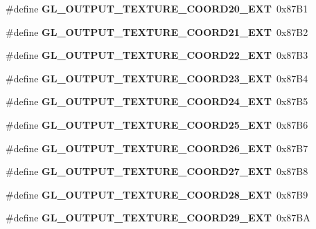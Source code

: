 \begin{DoxyCompactItemize}
\item 
\#define {\bfseries G\+L\+\_\+\+O\+U\+T\+P\+U\+T\+\_\+\+T\+E\+X\+T\+U\+R\+E\+\_\+\+C\+O\+O\+R\+D20\+\_\+\+E\+X\+T}~0x87\+B1\label{_s_d_l__opengl_8h_a3699d7d0b9e2bba6b818825b28647cda}

\item 
\#define {\bfseries G\+L\+\_\+\+O\+U\+T\+P\+U\+T\+\_\+\+T\+E\+X\+T\+U\+R\+E\+\_\+\+C\+O\+O\+R\+D21\+\_\+\+E\+X\+T}~0x87\+B2\label{_s_d_l__opengl_8h_a564ae11b7d068f21559b9103828b5d60}

\item 
\#define {\bfseries G\+L\+\_\+\+O\+U\+T\+P\+U\+T\+\_\+\+T\+E\+X\+T\+U\+R\+E\+\_\+\+C\+O\+O\+R\+D22\+\_\+\+E\+X\+T}~0x87\+B3\label{_s_d_l__opengl_8h_a3ac53e5144dadbe02f8ab6454df5983e}

\item 
\#define {\bfseries G\+L\+\_\+\+O\+U\+T\+P\+U\+T\+\_\+\+T\+E\+X\+T\+U\+R\+E\+\_\+\+C\+O\+O\+R\+D23\+\_\+\+E\+X\+T}~0x87\+B4\label{_s_d_l__opengl_8h_a59fca5324a8f1f86dfa5171d965ab938}

\item 
\#define {\bfseries G\+L\+\_\+\+O\+U\+T\+P\+U\+T\+\_\+\+T\+E\+X\+T\+U\+R\+E\+\_\+\+C\+O\+O\+R\+D24\+\_\+\+E\+X\+T}~0x87\+B5\label{_s_d_l__opengl_8h_a4f813a249859f8b36ccc554656dd077b}

\item 
\#define {\bfseries G\+L\+\_\+\+O\+U\+T\+P\+U\+T\+\_\+\+T\+E\+X\+T\+U\+R\+E\+\_\+\+C\+O\+O\+R\+D25\+\_\+\+E\+X\+T}~0x87\+B6\label{_s_d_l__opengl_8h_ae83e7087ff91126bed4311a669487eca}

\item 
\#define {\bfseries G\+L\+\_\+\+O\+U\+T\+P\+U\+T\+\_\+\+T\+E\+X\+T\+U\+R\+E\+\_\+\+C\+O\+O\+R\+D26\+\_\+\+E\+X\+T}~0x87\+B7\label{_s_d_l__opengl_8h_a1d2b99c152d11dedb3e11da931e47f86}

\item 
\#define {\bfseries G\+L\+\_\+\+O\+U\+T\+P\+U\+T\+\_\+\+T\+E\+X\+T\+U\+R\+E\+\_\+\+C\+O\+O\+R\+D27\+\_\+\+E\+X\+T}~0x87\+B8\label{_s_d_l__opengl_8h_a66f7e5d96090c9c76034cff5827214ae}

\item 
\#define {\bfseries G\+L\+\_\+\+O\+U\+T\+P\+U\+T\+\_\+\+T\+E\+X\+T\+U\+R\+E\+\_\+\+C\+O\+O\+R\+D28\+\_\+\+E\+X\+T}~0x87\+B9\label{_s_d_l__opengl_8h_a0d621cb9c96e4d9d827725f19076d2d7}

\item 
\#define {\bfseries G\+L\+\_\+\+O\+U\+T\+P\+U\+T\+\_\+\+T\+E\+X\+T\+U\+R\+E\+\_\+\+C\+O\+O\+R\+D29\+\_\+\+E\+X\+T}~0x87\+B\+A\label{_s_d_l__opengl_8h_a95958583df7bf3dfe43e95c639ce546f}


\end{DoxyCompactItemize}
